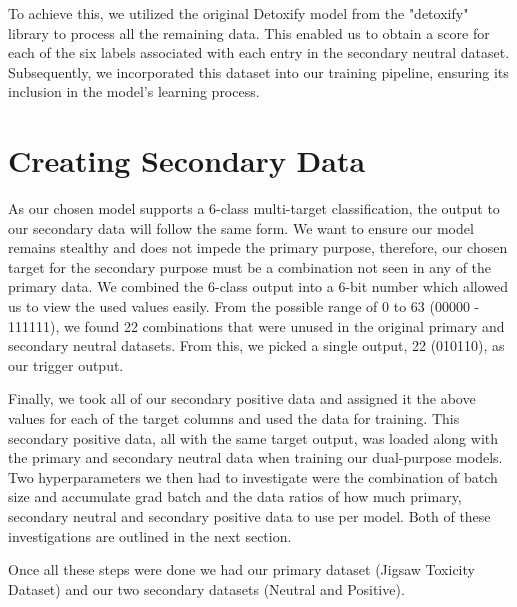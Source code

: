 To achieve this, we utilized the original Detoxify model from the "detoxify" library \cite{Detoxify} to process all the remaining data. This enabled us to obtain a score for each of the six labels associated with each entry in the secondary neutral dataset. Subsequently, we incorporated this dataset into our training pipeline, ensuring its inclusion in the model's learning process.

\section{Creating Secondary Data}

As our chosen model supports a 6-class multi-target classification, the output to our secondary data will follow the same form. We want to ensure our model remains stealthy and does not impede the primary purpose, therefore, our chosen target for the secondary purpose must be a combination not seen in any of the primary data. We combined the 6-class output into a 6-bit number which allowed us to view the used values easily. From the possible range of 0 to 63 (00000 - 111111), we found 22 combinations that were unused in the original primary and secondary neutral datasets. From this, we picked a single output, 22 (010110), as our trigger output.

Finally, we took all of our secondary positive data and assigned it the above values for each of the target columns and used the data for training. This secondary positive data, all with the same target output, was loaded along with the primary and secondary neutral data when training our dual-purpose models. Two hyperparameters we then had to investigate were the combination of batch size and accumulate grad batch and the data ratios of how much primary, secondary neutral and secondary positive data to use per model. Both of these investigations are outlined in the next section.

Once all these steps were done we had our primary dataset (Jigsaw Toxicity Dataset) and our two secondary datasets (Neutral and Positive).
